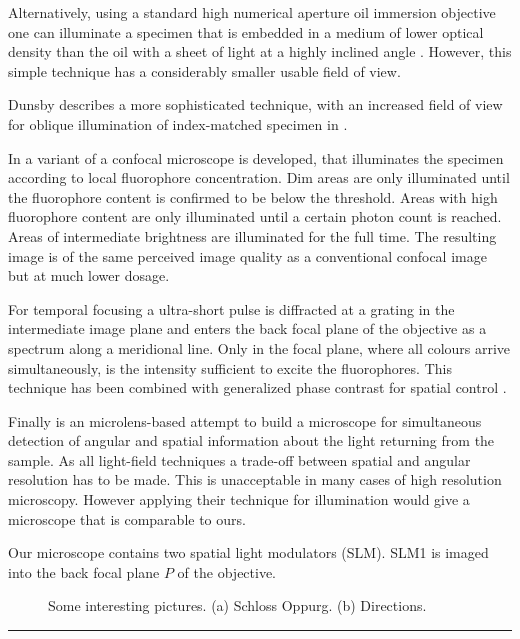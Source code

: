 \documentclass[a4paper, 11pt]{article}
\begin{document}
\begin{multicols}{2}
Alternatively, using a standard high numerical aperture oil immersion
objective one can illuminate a specimen that is embedded in a medium
of lower optical density than the oil with a sheet of light at a
highly inclined angle \cite{Tokunaga2008,Konopka2008}. However, this
simple technique has a considerably smaller usable field of view.

Dunsby describes a more sophisticated technique, with an increased
field of view for oblique illumination of index-matched specimen in
\cite{Dunsby2008}.

In \cite{Hoebe2007} a variant of a confocal microscope is developed,
that illuminates the specimen according to local fluorophore
concentration. Dim areas are only illuminated until the fluorophore
content is confirmed to be below the threshold. Areas with high
fluorophore content are only illuminated until a certain photon count
is reached. Areas of intermediate brightness are illuminated for the
full time. The resulting image is of the same perceived image quality
as a conventional confocal image but at much lower dosage.

For temporal focusing \cite{Oron2005} a ultra-short pulse is
diffracted at a grating in the intermediate image plane and enters the
back focal plane of the objective as a spectrum along a meridional
line. Only in the focal plane, where all colours arrive
simultaneously, is the intensity sufficient to excite the
fluorophores. This technique has been combined with generalized phase
contrast for spatial control \cite{Papagiakoumou2010}.

Finally \cite{Levoy2009} is an microlens-based attempt to build a
microscope for simultaneous detection of angular and spatial
information about the light returning from the sample. As all
light-field techniques a trade-off between spatial and angular
resolution has to be made. This is unacceptable in many cases of high
resolution microscopy. However applying their technique for
illumination would give a microscope that is comparable to ours.

 Our microscope contains two
spatial light modulators (SLM). SLM1 is imaged into the back focal
plane $P$ of the objective.

\begin{figure}[H]
{\scriptsize }
\caption{Some interesting pictures. (a) Schloss Oppurg. (b) Directions.}
\label{fig:figure1}
\end{figure}

\end{multicols}

\begin{center}
\rule{0.75\textwidth}{1pt}
\end{center}



\end{document}
